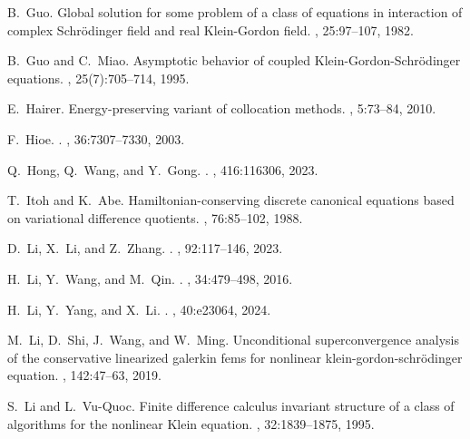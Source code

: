 \documentclass[fleqn,11pt]{elsarticle}
\numberwithin{equation}{section}
\begin{document}
\begin{thebibliography}{10}
B.~Guo.
\newblock Global solution for some problem of a class of equations in interaction of complex {S}chr\"odinger field and real {Klein-Gordon} field.
, 25:97--107, 1982.

B.~Guo and C.~Miao.
\newblock Asymptotic behavior of coupled {Klein-Gordon-Schr\"odinger} equations.
, 25(7):705--714, 1995.

E.~Hairer.
\newblock Energy-preserving variant of collocation methods.
, 5:73--84, 2010.

F.~Hioe.
.
, 36:7307--7330, 2003.

Q.~Hong, Q.~Wang, and Y.~Gong.
.
, 416:116306, 2023.

T.~Itoh and K.~Abe.
\newblock Hamiltonian-conserving discrete canonical equations based on variational difference quotients.
, 76:85--102, 1988.

D.~Li, X.~Li, and Z.~Zhang.
.
, 92:117--146, 2023.

H.~Li, Y.~Wang, and M.~Qin.
.
, 34:479--498, 2016.

H.~Li, Y.~Yang, and X.~Li.
.
, 40:e23064, 2024.

M.~Li, D.~Shi, J.~Wang, and W.~Ming.
\newblock Unconditional superconvergence analysis of the conservative linearized galerkin fems for nonlinear klein-gordon-schr{\"o}dinger equation.
, 142:47--63, 2019.

S.~Li and L.~{Vu-Quoc}.
\newblock Finite difference calculus invariant structure of a class of algorithms for the nonlinear {{Klein}} equation.
, 32:1839--1875, 1995.


\end{thebibliography}
\end{document}
